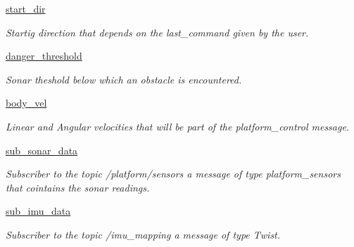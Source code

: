 \begin{DoxyCompactItemize}
\mbox{\hyperlink{classoab__miro_1_1ObstacleAvoidance_a9241219fb6f3e9f4e4a1117660c2833d}{start\+\_\+dir}}
\begin{DoxyCompactList}\small\item\em Startig direction that depends on the last\+\_\+command given by the user. \end{DoxyCompactList}\item 
\mbox{\label{classoab__miro_1_1ObstacleAvoidance_aaf439db92c20b964e43a718a8c5f1c3d}} 
\mbox{\hyperlink{classoab__miro_1_1ObstacleAvoidance_aaf439db92c20b964e43a718a8c5f1c3d}{danger\+\_\+threshold}}
\begin{DoxyCompactList}\small\item\em Sonar theshold below which an obstacle is encountered. \end{DoxyCompactList}\item 
\mbox{\label{classoab__miro_1_1ObstacleAvoidance_a79c75ee545d131758304c200db00628d}} 
\mbox{\hyperlink{classoab__miro_1_1ObstacleAvoidance_a79c75ee545d131758304c200db00628d}{body\+\_\+vel}}
\begin{DoxyCompactList}\small\item\em Linear and Angular velocities that will be part of the platform\+\_\+control message. \end{DoxyCompactList}\item 
\mbox{\label{classoab__miro_1_1ObstacleAvoidance_af2ca6b001b6d5072fae5bb2a8b82de71}} 
\mbox{\hyperlink{classoab__miro_1_1ObstacleAvoidance_af2ca6b001b6d5072fae5bb2a8b82de71}{sub\+\_\+sonar\+\_\+data}}
\begin{DoxyCompactList}\small\item\em Subscriber to the topic /platform/sensors a message of type platform\+\_\+sensors that cointains the sonar readings. \end{DoxyCompactList}\item 
\mbox{\label{classoab__miro_1_1ObstacleAvoidance_a72496bf39cea30e8a13aebae68568c05}} 
\mbox{\hyperlink{classoab__miro_1_1ObstacleAvoidance_a72496bf39cea30e8a13aebae68568c05}{sub\+\_\+imu\+\_\+data}}
\begin{DoxyCompactList}\small\item\em Subscriber to the topic /imu\+\_\+mapping a message of type Twist. \end{DoxyCompactList}\item 

\end{DoxyCompactItemize}
